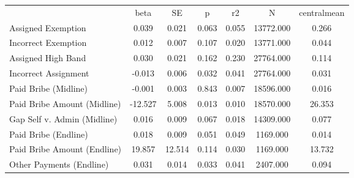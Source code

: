 {\def\sym#1{\ifmmode^{#1}\else\(^{#1}\)\fi} \begin{tabular}{l*{6}{c}} \hline\hline 
& beta & SE & p & r2 & N & centralmean \\
Assigned Exemption & 0.039 & 0.021 & 0.063 & 0.055 & 13772.000 & 0.266 \\
Incorrect Exemption & 0.012 & 0.007 & 0.107 & 0.020 & 13771.000 & 0.044 \\
Assigned High Band & 0.030 & 0.021 & 0.162 & 0.230 & 27764.000 & 0.114 \\
Incorrect Assignment & -0.013 & 0.006 & 0.032 & 0.041 & 27764.000 & 0.031 \\
Paid Bribe (Midline) & -0.001 & 0.003 & 0.843 & 0.007 & 18596.000 & 0.016 \\
Paid Bribe Amount (Midline) & -12.527 & 5.008 & 0.013 & 0.010 & 18570.000 & 26.353 \\
Gap Self v. Admin (Midline) & 0.016 & 0.009 & 0.067 & 0.018 & 14309.000 & 0.077 \\
Paid Bribe (Endline) & 0.018 & 0.009 & 0.051 & 0.049 & 1169.000 & 0.014 \\
Paid Bribe Amount (Endline) & 19.857 & 12.514 & 0.114 & 0.030 & 1169.000 & 13.732 \\
Other Payments (Endline) & 0.031 & 0.014 & 0.033 & 0.041 & 2407.000 & 0.094 \\
\hline\hline \end{tabular} }
